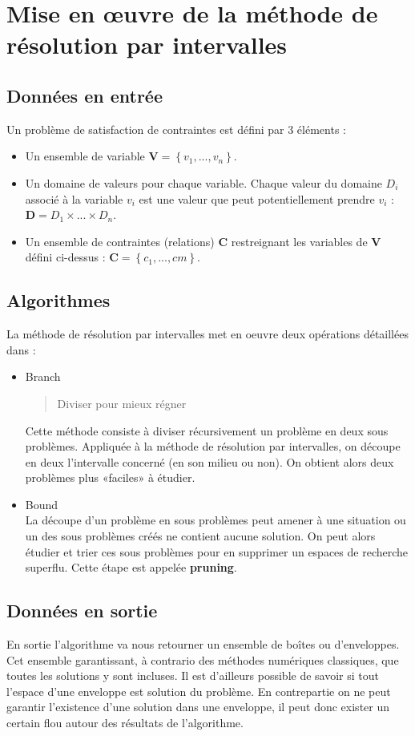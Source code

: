 \section{Mise en œuvre de la méthode de résolution par intervalles}


\subsection{Données en entrée}
Un problème de satisfaction de contraintes est défini par 3 éléments : 
\begin{itemize}
\item
Un ensemble de variable $\mathbf{V} = \left\{ v_1,...,v_n \right\}$.
\item
Un domaine de valeurs pour chaque variable. Chaque valeur du domaine $D_i$ associé à la variable $v_i$ est une valeur que peut potentiellement prendre $v_i$ : $\mathbf{D} = D_1 \times ... \times D_n $.
\item
Un ensemble de contraintes (relations) $\mathbf{C}$ restreignant les variables de $\mathbf{V}$ défini ci-dessus :  $\mathbf{C} = \left\{c_1,...,cm\right\}$. 
\end{itemize}

\subsection{Algorithmes}
La méthode de résolution par intervalles met en oeuvre deux opérations détaillées dans \cite{Neumaier}: 
\begin{itemize}
\item{Branch}
\begin{quote}Diviser pour mieux régner\end{quote} Cette méthode consiste à diviser récursivement un problème en deux sous problèmes. Appliquée à la méthode de résolution par intervalles, on découpe en deux l'intervalle concerné (en son milieu ou non). On obtient alors deux problèmes plus «faciles» à étudier.
\item{Bound}\\
La découpe d'un problème en sous problèmes peut amener à une situation ou un des sous problèmes créés ne contient aucune solution. On peut alors étudier et trier ces sous problèmes pour en supprimer un espaces de recherche superflu. Cette étape est appelée \textbf{pruning}.
\end{itemize}

\subsection{Données en sortie}
En sortie l'algorithme va nous retourner un ensemble de boîtes ou d'enveloppes. Cet ensemble garantissant, à contrario des méthodes numériques classiques, que toutes les solutions y sont incluses. Il est d'ailleurs possible de savoir si tout l'espace d'une enveloppe est solution du problème. En contrepartie on ne peut garantir l'existence d'une solution dans une enveloppe, il peut donc exister un certain flou autour des résultats de l'algorithme.
